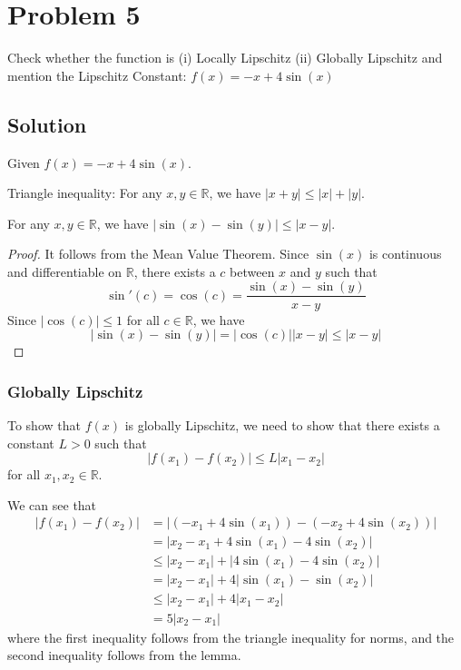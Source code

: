 \section*{Problem 5}

Check whether the function is
(i) Locally Lipschitz
(ii) Globally Lipschitz
and mention the Lipschitz Constant:
\( f (x) = -x + 4\sin(x) \)

\subsection*{Solution}

Given \( f(x) = -x + 4\sin(x) \).

\begin{lemma}{Triangle inequality:}
    For any \( x, y \in \mathbb{R} \), we have \( \lvert x + y \rvert \leq \lvert x \rvert + \lvert y \rvert \).
\end{lemma}

\begin{lemma}
    For any \( x, y \in \mathbb{R} \), we have \( \lvert \sin(x) - \sin(y) \rvert \leq \lvert x - y \rvert \).
\end{lemma}
\begin{proof}
    It follows from the Mean Value Theorem.
    Since \( \sin(x) \) is continuous and differentiable on \( \mathbb{R} \), there exists a \( c \) between \( x \) and \( y \) such that
    \[
        \sin'(c) = \cos(c) = \frac{\sin(x) - \sin(y)}{x - y}
    \]
    Since \( \lvert \cos(c) \rvert \leq 1 \) for all \( c \in \mathbb{R} \), we have
    \[
        \lvert \sin(x) - \sin(y) \rvert
        =
        \lvert \cos(c) \rvert \lvert x - y \rvert
        \leq
        \lvert x - y \rvert
    \]
\end{proof}

\subsubsection*{Globally Lipschitz}

To show that \( f(x) \) is globally Lipschitz, we need to show that there exists a constant \( L > 0 \) such that
\[
    \lvert f(x_1) - f(x_2) \rvert \leq L \lvert x_1 - x_2 \rvert
\]
for all \( x_1, x_2 \in \mathbb{R} \).

We can see that
\begin{align*}
    \lvert f(x_1) - f(x_2) \rvert
     & =
    \lvert (-x_1 + 4\sin(x_1)) - (-x_2 + 4\sin(x_2)) \rvert
    \\ & =
    \lvert x_2 - x_1 + 4\sin(x_1) - 4\sin(x_2) \rvert
    \\ & \leq
    \lvert x_2 - x_1 \rvert + \lvert 4\sin(x_1) - 4\sin(x_2) \rvert
    \\ & =
    \lvert x_2 - x_1 \rvert + 4 \lvert \sin(x_1) - \sin(x_2) \rvert
    \\ & \leq
    \lvert x_2 - x_1 \rvert + 4 \lvert x_1 - x_2 \rvert
    \\ & = 5 \lvert x_2 - x_1 \rvert
\end{align*}
where the first inequality follows from the triangle inequality for norms, and the second inequality follows from the lemma.

